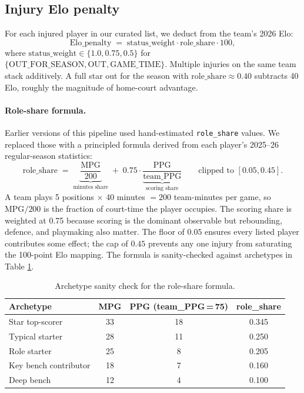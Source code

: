 \documentclass[11pt, a4paper]{article}
\begin{document}
\subsection{Injury Elo penalty}
\label{sec:injuries}

For each injured player in our curated list, we deduct from the team's 2026 Elo:
\begin{equation}
    \text{Elo\_penalty} \;=\; \text{status\_weight} \cdot \text{role\_share} \cdot 100,
\end{equation}
where $\text{status\_weight} \in \{1.0, 0.75, 0.5\}$ for $\{\text{OUT\_FOR\_SEASON}, \text{OUT}, \text{GAME\_TIME}\}$. Multiple injuries on the same team stack additively. A full star out for the season with $\text{role\_share} \approx 0.40$ subtracts 40 Elo, roughly the magnitude of home-court advantage.

\paragraph{Role-share formula.}
Earlier versions of this pipeline used hand-estimated \texttt{role\_share} values. We replaced those with a principled formula derived from each player's 2025--26 regular-season statistics:
\begin{equation}
    \text{role\_share} \;=\; \underbrace{\frac{\text{MPG}}{200}}_{\text{minutes share}} \;+\; 0.75 \cdot \underbrace{\frac{\text{PPG}}{\text{team\_PPG}}}_{\text{scoring share}}
    \qquad \text{clipped to } [0.05, 0.45].
\end{equation}
A team plays 5 positions $\times$ 40 minutes $= 200$ team-minutes per game, so $\text{MPG}/200$ is the fraction of court-time the player occupies. The scoring share is weighted at 0.75 because scoring is the dominant observable but rebounding, defence, and playmaking also matter. The floor of $0.05$ ensures every listed player contributes some effect; the cap of $0.45$ prevents any one injury from saturating the 100-point Elo mapping. The formula is sanity-checked against archetypes in Table \ref{tab:archetype}.

\begin{table}[H]
\centering
\begin{tabular}{@{}lccc@{}}
\toprule
\textbf{Archetype} & \textbf{MPG} & \textbf{PPG (team\_PPG\,=\,75)} & \textbf{role\_share} \\
\midrule
Star top-scorer        & 33 & 18 & 0.345 \\
Typical starter        & 28 & 11 & 0.250 \\
Role starter           & 25 & 8  & 0.205 \\
Key bench contributor  & 18 & 7  & 0.160 \\
Deep bench             & 12 & 4  & 0.100 \\
\bottomrule
\end{tabular}
\caption{Archetype sanity check for the role-share formula.}
\label{tab:archetype}
\end{table}
\end{document}
